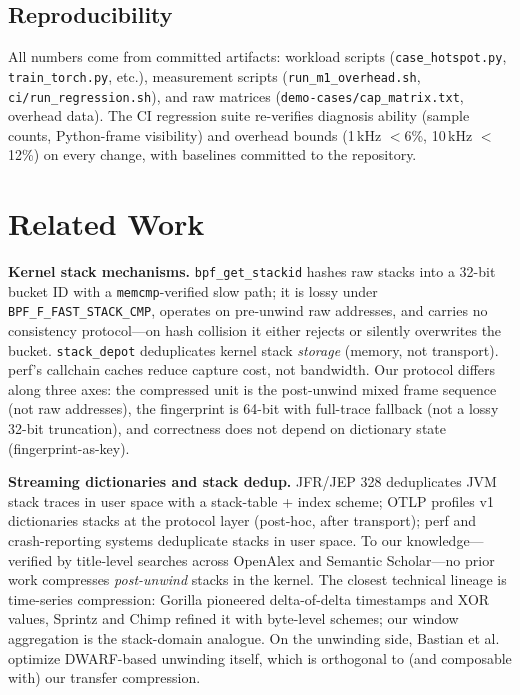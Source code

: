 \documentclass[letterpaper,twocolumn,10pt]{article}
\begin{document}
\subsection{Reproducibility}
\label{sec:repro}
All numbers come from committed artifacts: workload scripts
(\texttt{case\_hotspot.py}, \texttt{train\_torch.py}, etc.), measurement
scripts (\texttt{run\_m1\_overhead.sh}, \texttt{ci/run\_regression.sh}),
and raw matrices (\texttt{demo-cases/cap\_matrix.txt}, overhead data).
The CI regression suite re-verifies diagnosis ability (sample counts,
Python-frame visibility) and overhead bounds (1\,kHz $<$6\%, 10\,kHz
$<$12\%) on every change, with baselines committed to the repository.

\section{Related Work}
\textbf{Kernel stack mechanisms.} \texttt{bpf\_get\_stackid}
\cite{bpfdocs} hashes raw stacks into a 32-bit bucket ID with a
\texttt{memcmp}-verified slow path; it is lossy under
\texttt{BPF\_F\_FAST\_STACK\_CMP}, operates on pre-unwind raw addresses,
and carries no consistency protocol---on hash collision it either rejects
or silently overwrites the bucket. \texttt{stack\_depot} deduplicates
kernel stack \emph{storage} (memory, not transport). perf's callchain
caches reduce capture cost, not bandwidth. Our protocol differs along
three axes: the compressed unit is the post-unwind mixed frame sequence
(not raw addresses), the fingerprint is 64-bit with full-trace fallback
(not a lossy 32-bit truncation), and correctness does not depend on
dictionary state (fingerprint-as-key).

\textbf{Streaming dictionaries and stack dedup.} JFR/JEP 328 \cite{jfr}
deduplicates JVM stack traces in user space with a stack-table + index
scheme; OTLP profiles v1 \cite{otelprof} dictionaries stacks at the
protocol layer (post-hoc, after transport); perf and crash-reporting
systems deduplicate stacks in user space. To our knowledge---verified by
title-level searches across OpenAlex and Semantic Scholar---no prior work
compresses \emph{post-unwind} stacks in the kernel. The closest technical
lineage is time-series compression: Gorilla \cite{gorilla} pioneered
delta-of-delta timestamps and XOR values, Sprintz \cite{sprintz} and
Chimp \cite{chimp} refined it with byte-level schemes; our window
aggregation is the stack-domain analogue. On the unwinding side,
Bastian et al. \cite{dwarf} optimize DWARF-based unwinding itself, which
is orthogonal to (and composable with) our transfer compression.
\end{document}

